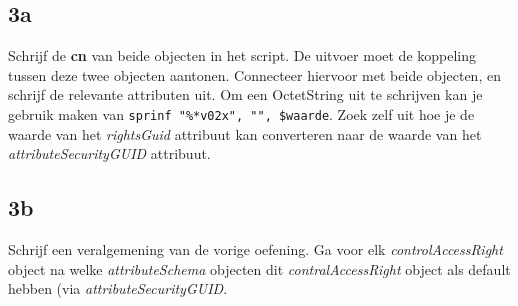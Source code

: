 \documentclass{article}
\begin{document}
\subsection*{3a}
Schrijf de \textbf{cn} van beide objecten in het script. De uitvoer moet de koppeling tussen deze twee objecten aantonen. Connecteer hiervoor met beide objecten, en schrijf de relevante attributen uit. Om een OctetString uit te schrijven kan je gebruik maken van \texttt{sprinf "\%*v02x", "", \$waarde}. Zoek zelf uit hoe je de waarde van het \textit{rightsGuid} attribuut kan converteren naar de waarde van het \textit{attributeSecurityGUID} attribuut.
\subsection*{3b}
Schrijf een veralgemening van de vorige oefening. Ga voor elk \textit{controlAccessRight} object na welke \textit{attributeSchema} objecten dit \textit{contralAccessRight} object als default hebben (via \textit{attributeSecurityGUID}. 
\end{document}
